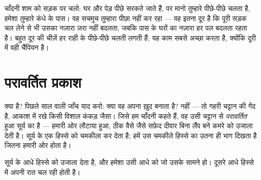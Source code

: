 \begin{example}[पीछे-पीछे आता चंद्रमा]\label{ex:g2:moon-in-the-sky:follows}
चाँदनी शाम को सड़क पर चलो: घर और पेड़ पीछे सरकते जाते हैं, पर 
मानो तुम्हारे पीछे-पीछे चलता है, हमेशा तुम्हारे कंधे के पास। वह
सचमुच तुम्हारा पीछा नहीं कर रहा --- वह इतना दूर है कि पूरी सड़क चल
लेने से भी उसका नज़ारा ज़रा नहीं बदलता, जबकि पास के घरों का नज़ारा हर
पल बदलता रहता है। बहुत दूर की चीज़ें हर राही के पीछे-पीछे चलती लगती
हैं;  यह काम सबसे अच्छा करता है, क्योंकि दूरी में वही चैंपियन
है।
\end{example}

\section{परावर्तित प्रकाश}

\begin{example}[चाँदनी असल में सूर्य का प्रकाश है]\label{ex:g2:moon-in-the-sky:borrowed}
क्या   है? पिछले साल वाली जाँच याद करो: क्या वह
अपना  ख़ुद बनाता है? नहीं ---  तो गहरी चट्टान की गेंद
है, आकाश में रखे किसी विशाल कंकड़ जैसा। जिसे हम चाँदनी कहते हैं, वह
उसी चट्टान से \emph{परावर्तित} हुआ सूर्य का  है --- हमारी ओर
लौटाया हुआ, ठीक वैसे जैसे सफ़ेद दीवार बिना लैंप बने कमरे को उजाला
देती है। सूर्य  के एक हिस्से को चमकीला कर देता है; हमें उस
चमकीले हिस्से का उतना ही भाग दिखता है जितना हमारी ओर होता है।
\end{example}

\begin{omfigure}

{\small सूर्य  के आधे हिस्से को उजाला देता है, और हमेशा उसी
आधे को जो उसके सामने हो। दूसरे आधे हिस्से में अपनी रात चल रही होती
है।}
\end{omfigure}

